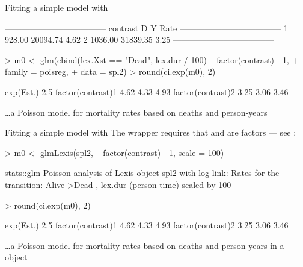 \begin{frame}[fragile]{Fitting a simple model with }
\begin{Schunk}
\begin{Soutput}
 ------------------------------------ 
 contrast         D        Y    Rate  
 ------------------------------------ 
 1           928.00 20094.74    4.62  
 2          1036.00 31839.35    3.25  
 ------------------------------------ 
\end{Soutput}
\end{Schunk}
\begin{Schunk}
\begin{Sinput}
> m0 <- glm(cbind(lex.Xst == "Dead", lex.dur / 100) ~ factor(contrast) - 1,
+           family = poisreg,
+             data = spl2)
> round(ci.exp(m0), 2)
\end{Sinput}
\begin{Soutput}
                  exp(Est.) 2.5%
factor(contrast)1      4.62 4.33  4.93
factor(contrast)2      3.25 3.06  3.46
\end{Soutput}
\end{Schunk}
\small
\ldots a Poisson model for mortality rates based on deaths and person-years
\end{frame}

\begin{frame}[fragile]{Fitting a simple model with }
\small
The wrapper  requires that  and 
are factors --- see :
\vspace*{-1ex}
\begin{Schunk}
\begin{Sinput}
> m0 <- glmLexis(spl2, ~ factor(contrast) - 1, scale = 100)
\end{Sinput}
\begin{Soutput}
stats::glm Poisson analysis of Lexis object spl2 with log link:
Rates for the transition:
Alive->Dead
, lex.dur (person-time) scaled by 100
\end{Soutput}
\begin{Sinput}
> round(ci.exp(m0), 2)
\end{Sinput}
\begin{Soutput}
                  exp(Est.) 2.5%
factor(contrast)1      4.62 4.33  4.93
factor(contrast)2      3.25 3.06  3.46
\end{Soutput}
\end{Schunk}
\small
\ldots a Poisson model for mortality rates based on deaths and
person-years in a  object
\end{frame}

